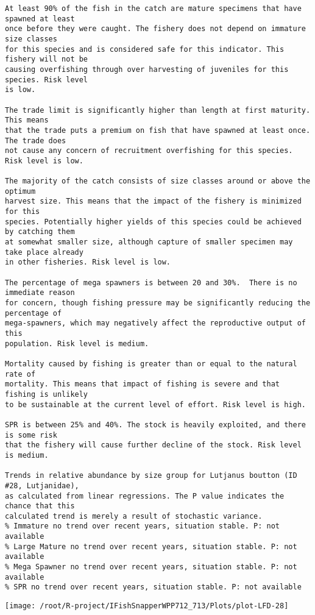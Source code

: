 \documentclass{report}\usepackage[]{graphicx}\usepackage[]{color}
\makeatletter
\def\maxwidth{ %
  \ifdim\Gin@nat@width>\linewidth
    \linewidth
  \else
    \Gin@nat@width
  \fi
}
\newenvironment{kframe}{%
 \def\at@end@of@kframe{}%
 \ifinner\ifhmode%
  \def\at@end@of@kframe{\end{minipage}}%
  \begin{minipage}{\columnwidth}%
 \fi\fi%
 \def\FrameCommand##1{\hskip\@totalleftmargin \hskip-\fboxsep
 \colorbox{shadecolor}{##1}\hskip-\fboxsep
     \hskip-\linewidth \hskip-\@totalleftmargin \hskip\columnwidth}%
 \MakeFramed {\advance\hsize-\width
   \@totalleftmargin\z@ \linewidth\hsize
   \@setminipage}}%
 {\par\unskip\endMakeFramed%
 \at@end@of@kframe}
\newenvironment{knitrout}{}{} %
\makeatother
\begin{document}
\begin{knitrout}
\begin{kframe}
\begin{verbatim}
At least 90% of the fish in the catch are mature specimens that have spawned at least
once before they were caught. The fishery does not depend on immature size classes
for this species and is considered safe for this indicator. This fishery will not be
causing overfishing through over harvesting of juveniles for this species. Risk level
is low.

The trade limit is significantly higher than length at first maturity.  This means
that the trade puts a premium on fish that have spawned at least once. The trade does
not cause any concern of recruitment overfishing for this species. Risk level is low.

The majority of the catch consists of size classes around or above the optimum
harvest size. This means that the impact of the fishery is minimized for this
species. Potentially higher yields of this species could be achieved by catching them
at somewhat smaller size, although capture of smaller specimen may take place already
in other fisheries. Risk level is low.

The percentage of mega spawners is between 20 and 30%.  There is no immediate reason
for concern, though fishing pressure may be significantly reducing the percentage of
mega-spawners, which may negatively affect the reproductive output of this
population. Risk level is medium.
 
Mortality caused by fishing is greater than or equal to the natural rate of
mortality. This means that impact of fishing is severe and that fishing is unlikely
to be sustainable at the current level of effort. Risk level is high.
 
SPR is between 25% and 40%. The stock is heavily exploited, and there is some risk
that the fishery will cause further decline of the stock. Risk level is medium.
 
Trends in relative abundance by size group for Lutjanus boutton (ID #28, Lutjanidae),
as calculated from linear regressions. The P value indicates the chance that this
calculated trend is merely a result of stochastic variance.
% Immature no trend over recent years, situation stable. P: not available
% Large Mature no trend over recent years, situation stable. P: not available
% Mega Spawner no trend over recent years, situation stable. P: not available
% SPR no trend over recent years, situation stable. P: not available
\end{verbatim}
\end{kframe}
\texttt{[image: /root/R-project/IFishSnapperWPP712\_713/Plots/plot-LFD-28]} 


\end{knitrout}
\end{document}
